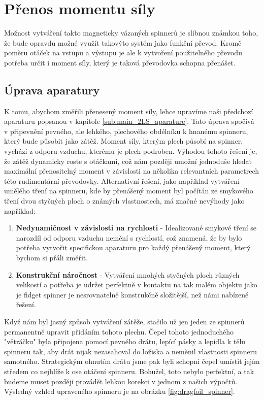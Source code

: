 \chapter{Přenos momentu síly}

Možnost vytváření takto magneticky vázaných spinnerů je slibnou známkou toho, že bude opravdu možné využít takovýto systém jako funkční převod. Kromě poměru otáček na vstupu a výstupu je ale k vytvoření použitelného převodu potřeba určit i moment síly, který je taková převodovka schopna přenášet.

\section{Úprava aparatury}

K tomu, abychom změřili přenesený moment síly, lehce upravíme naši předchozí aparaturu popsanou v kapitole \ref{sub:main_2LS_aparature}. Tato úprava spočívá v připevnění pevného, ale lehkého, plechového obdélníku k hnanému spinneru, který bude působit jako zátěž. Moment síly, kterým plech působí na spinner, vychází z odporu vzduchu, kterému je plech podroben. Výhodou tohoto řešení je, že zátěž dynamicky roste s otáčkami, což nám později umožní jednoduše hledat maximální přenositelný moment v závislosti na několika relevantních parametrech této rudimentární převodovky. Alternativní řešení, jako například vytváření umělého tření na spinneru, kde by přenášený moment byl počítán ze smykového tření dvou styčných ploch o známých vlastnostech, má značné nevýhody jako například: 

\begin{enumerate}[topsep=0pt, partopsep=0pt]
    \setlength{\itemsep}{0pt}%
    \setlength{\parskip}{0pt}%
    \item \textbf{Nedynamičnost v závislosti na rychlosti} - Idealizované smykové tření se narozdíl od odporu vzduchu nemění s rychlostí, což znamená, že by bylo potřeba vytvořit specifickou aparaturu pro každý přenášený moment, který bychom si přáli změřit.
    \item \textbf{Konstrukční náročnost} - Vytváření mnohých styčných ploch různých velikostí a potřeba je udržet perfektně v kontaktu na tak malém objektu jako je fidget spinner je nesrovnatelně konstrukčně složitější, než námi nabízené řešení.
\end{enumerate}

Když nám byl jasný způsob vytváření zátěže, stačilo už jen jeden ze spinnerů permanentně upravit přidáním tohoto plechu. Čepel tohoto jednoduchého "větráčku" byla připojena pomocí pevného drátu, lepící pásky a lepidla k tělu spinneru tak, aby drát nijak nezasahoval do ložiska a neměnil vlastnosti spinneru samotného. Strategickým ohnutím drátu jsme pak byli schopni čepel umístit jejím středem co nejblíže k ose otáčení spinneru. Bohužel, toto nebylo perfektní, a tak budeme muset později provádět lehkou korekci v jednom z našich výpočtů.
Výsledný vzhled upraveného spinneru je na obrázku \ref{fig:dragfoil_spinner}.

